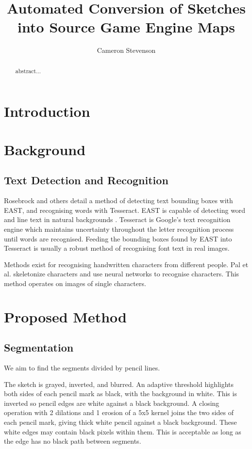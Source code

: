 \documentclass{IEEEtran}
\begin{document}
\title{Automated Conversion of Sketches into Source Game Engine Maps}
\author{Cameron Stevenson}
 
\begin{abstract}
abstract...
\end{abstract}

\maketitle

\section{Introduction}

\section{Background}
\subsection{Text Detection and Recognition}
Rosebrock \cite{rosebrock2018opencv} and others detail a method of detecting text bounding boxes with EAST, and recognising words with Tesseract. EAST is capable of detecting word and line text in natural backgrounds \cite{zhou2017east}. Tesseract \cite{smith2007overview} is Google's text recognition engine which maintains uncertainty throughout the letter recognition process until words are recognised. Feeding the bounding boxes found by EAST into Tesseract is usually a robust method of recognising font text in real images.

Methods exist for recognising handwritten characters from different people. Pal et al. \cite{pal2010handwritten} skeletonize characters and use neural networks to recognise characters. This method operates on images of single characters.

\section{Proposed Method}
\subsection{Segmentation}
We aim to find the segments divided by pencil lines.

The sketch is grayed, inverted, and blurred. An adaptive threshold highlights both sides of each pencil mark as black, with the background in white. This is inverted so pencil edges are white against a black background. A closing operation with 2 dilations and 1 erosion of a 5x5 kernel joins the two sides of each pencil mark, giving thick white pencil against a black background. These white edges may contain black pixels within them. This is acceptable as long as the edge has no black path between segments.
\end{document}
